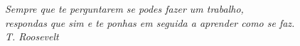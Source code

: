\begin{epigrafe}
    \vspace*{\fill}
	\begin{flushright}
		\textit{Sempre que te perguntarem se podes fazer um trabalho,\\
		respondas que sim e te ponhas em seguida a aprender como se faz.\\
		T. Roosevelt}
	\end{flushright}
\end{epigrafe}